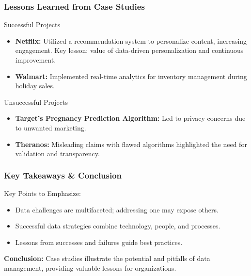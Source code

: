 \documentclass{beamer}
\begin{document}
\begin{frame}[fragile]
    \frametitle{Lessons Learned from Case Studies}
    \begin{block}{Successful Projects}
        \begin{itemize}
            \item \textbf{Netflix:} 
                Utilized a recommendation system to personalize content, increasing engagement. Key lesson: value of data-driven personalization and continuous improvement.
            \item \textbf{Walmart:} 
                Implemented real-time analytics for inventory management during holiday sales.
        \end{itemize}
    \end{block}
    
    \begin{block}{Unsuccessful Projects}
        \begin{itemize}
            \item \textbf{Target's Pregnancy Prediction Algorithm:} 
                Led to privacy concerns due to unwanted marketing.
            \item \textbf{Theranos:} 
                Misleading claims with flawed algorithms highlighted the need for validation and transparency.
        \end{itemize}
    \end{block}
\end{frame}

\begin{frame}[fragile]
    \frametitle{Key Takeaways & Conclusion}
    Key Points to Emphasize:
    \begin{itemize}
        \item Data challenges are multifaceted; addressing one may expose others.
        \item Successful data strategies combine technology, people, and processes.
        \item Lessons from successes and failures guide best practices.
    \end{itemize}
    
    \textbf{Conclusion:} 
    Case studies illustrate the potential and pitfalls of data management, providing valuable lessons for organizations.
\end{frame}
\end{document}
